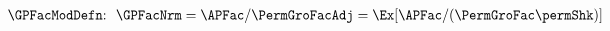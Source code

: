   \begin{align}
    \text{{\GPFacModDefn}:~~}    \GPFacNrm  & = \APFac/\PermGroFacAdj = \Ex[\APFac/(\PermGroFac\permShk)]  \phantom{\text{{\GPFacModDefn}:~~}} \label{eq:GPFacModDefn}
  \end{align}
